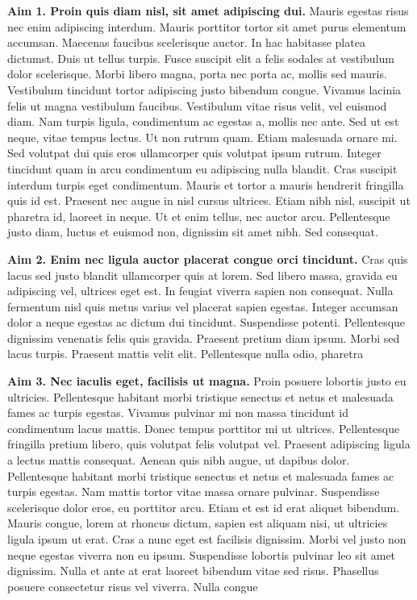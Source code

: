 \documentclass[11pt]{report}
\begin{document}
\textbf{Aim 1. Proin quis diam nisl, sit amet adipiscing dui.} Mauris
egestas risus nec enim adipiscing interdum. Mauris porttitor tortor
sit amet purus elementum accumsan. Maecenas faucibus scelerisque
auctor. In hac habitasse platea dictumst. Duis ut tellus turpis. Fusce
suscipit elit a felis sodales at vestibulum dolor scelerisque. Morbi
libero magna, porta nec porta ac, mollis sed mauris. Vestibulum
tincidunt tortor adipiscing justo bibendum congue. Vivamus lacinia
felis ut magna vestibulum faucibus. Vestibulum vitae risus velit, vel
euismod diam. Nam turpis ligula, condimentum ac egestas a, mollis nec
ante. Sed ut est neque, vitae tempus lectus. Ut non rutrum quam. Etiam
malesuada ornare mi. Sed volutpat dui quis eros ullamcorper quis
volutpat ipsum rutrum. Integer tincidunt quam in arcu condimentum eu
adipiscing nulla blandit. Cras suscipit interdum turpis eget
condimentum. Mauris et tortor a mauris hendrerit fringilla quis id
est. Praesent nec augue in nisl cursus ultrices. Etiam nibh nisl,
suscipit ut pharetra id, laoreet in neque. Ut et enim tellus, nec
auctor arcu. Pellentesque justo diam, luctus et euismod non, dignissim
sit amet nibh. Sed consequat.

\textbf{Aim 2. Enim nec ligula auctor placerat congue orci tincidunt.}
Cras quis lacus sed justo blandit ullamcorper quis at lorem. Sed
libero massa, gravida eu adipiscing vel, ultrices eget est. In feugiat
viverra sapien non consequat. Nulla fermentum nisl quis metus varius
vel placerat sapien egestas. Integer accumsan dolor a neque egestas ac
dictum dui tincidunt. Suspendisse potenti. Pellentesque dignissim
venenatis felis quis gravida. Praesent pretium diam ipsum. Morbi sed
lacus turpis. Praesent mattis velit elit. Pellentesque nulla odio,
pharetra

\textbf{Aim 3. Nec iaculis eget, facilisis ut magna.} Proin posuere
lobortis justo eu ultricies. Pellentesque habitant morbi tristique
senectus et netus et malesuada fames ac turpis egestas. Vivamus
pulvinar mi non massa tincidunt id condimentum lacus mattis. Donec
tempus porttitor mi ut ultrices. Pellentesque fringilla pretium
libero, quis volutpat felis volutpat vel. Praesent adipiscing ligula a
lectus mattis consequat. Aenean quis nibh augue, ut dapibus dolor.
Pellentesque habitant morbi tristique senectus et netus et malesuada
fames ac turpis egestas. Nam mattis tortor vitae massa ornare
pulvinar. Suspendisse scelerisque dolor eros, eu porttitor arcu. Etiam
et est id erat aliquet bibendum. Mauris congue, lorem at rhoncus
dictum, sapien est aliquam nisi, ut ultricies ligula ipsum ut erat.
Cras a nunc eget est facilisis dignissim. Morbi vel justo non neque
egestas viverra non eu ipsum. Suspendisse lobortis pulvinar leo sit
amet dignissim. Nulla et ante at erat laoreet bibendum vitae sed
risus. Phasellus posuere consectetur risus vel viverra. Nulla congue
\end{document}

